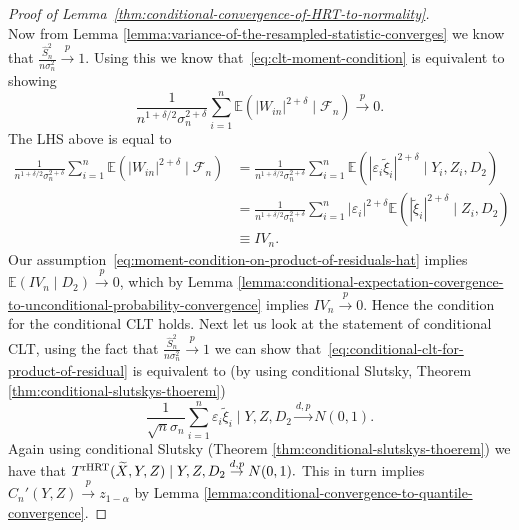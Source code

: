 \documentclass[12pt]{article}
\theoremstyle{definition}
\theoremstyle{remark}
\newcommand{\E}{\mathbb E}								%
\newcommand{\srx}{X}									%
\newcommand{\srz}{Z}									%
\newcommand{\sry}{Y}									%
\begin{document}
\begin{proof}[Proof of Lemma~\ref{thm:conditional-convergence-of-HRT-to-normality}]
\begin{equation}
	\end{equation}
	Now from Lemma \ref{lemma:variance-of-the-resampled-statistic-converges} we know that $\frac{\widehat S^2_n}{n\sigma_n^2} \overset{p}{\to} 1$. Using this we know that~\eqref{eq:clt-moment-condition} is equivalent to showing
	$$
	\frac{1}{n^{1+\delta/2}\sigma_n^{2+\delta}} \sum_{i=1}^n \E(|W_{in}|^{2+\delta} \mid \mathcal{F}_n) \overset{p}{\to} 0.
	$$
	The LHS above is equal to
	\begin{align*}
		\frac{1}{n^{1+\delta/2}\sigma_n^{2+\delta}} \sum_{i=1}^n \E(|W_{in}|^{2+\delta} \mid \mathcal{F}_n)  &= 	\frac{1}{n^{1+\delta/2}\sigma_n^{2+\delta}} \sum_{i=1}^n \E(|\varepsilon_i\widetilde\xi_i|^{2+\delta} \mid \sry_i,\srz_i,D_2) \\
		&= \frac{1}{n^{1+\delta/2}\sigma_n^{2+\delta}} \sum_{i=1}^n |\varepsilon_i|^{2+\delta}\E(|\widetilde\xi_i|^{2+\delta} \mid \srz_i,D_2) \\
		&\equiv IV_n.
	\end{align*}
	Our assumption~\eqref{eq:moment-condition-on-product-of-residuals-hat} implies $\E(IV_n \mid D_2) \overset{p}{\to} 0$, which by Lemma \ref{lemma:conditional-expectation-covergence-to-unconditional-probability-convergence} implies $IV_n\overset{p}{\to} 0$. Hence the condition for the conditional CLT holds. Next let us look at the statement of conditional CLT, using the fact that  $\frac{\widehat S^2_n}{n\sigma_n^2} \overset{p}{\to} 1$ we can show that~\eqref{eq:conditional-clt-for-product-of-residual} is equivalent to (by using conditional Slutsky, Theorem \ref{thm:conditional-slutskys-thoerem})
	$$
	\frac{1}{\sqrt n \sigma_n} \sum_{i=1}^n \varepsilon_i\widetilde\xi_i \mid \sry, \srz, D_2\overset{d,p}{\to} N(0,1).
	$$
	Again using conditional Slutsky (Theorem \ref{thm:conditional-slutskys-thoerem}) we have that $ T^{\textnormal{rHRT}}(\widetilde \srx,\sry,\srz) \mid \sry,\srz, D_2\overset{d,p}{\to} N(0,1).$ This in turn implies $C_n'(\sry,\srz) \overset{p}{\to} z_{1-\alpha}$ by Lemma \ref{lemma:conditional-convergence-to-quantile-convergence}.
\end{proof}	
\end{document}
